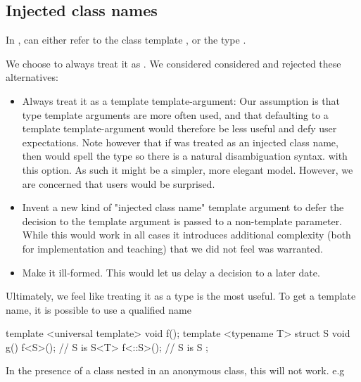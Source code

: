 \documentclass{wg21}
\begin{document}
\subsection{Injected class names}

In ,  can either refer to the class template , or the type .

We choose to always treat it as .
We considered considered and rejected these alternatives:

\begin{itemize}
\item Always treat it as a template template-argument: Our assumption is that type template arguments are more often used, and that defaulting to a template template-argument would therefore be less useful and defy user expectations.
Note however that if  was treated as an injected class name, then  would spell the type so there is a natural disambiguation syntax.
with this option. As such it might be a simpler, more elegant model. However, we are concerned that users would be surprised.

\item Invent a new kind of "injected class name" template argument to defer the decision to the template argument is passed to a non-template parameter.
While this would work in all cases it introduces additional complexity (both for implementation and teaching) that we did not feel was warranted.
\item Make it ill-formed. This would let us delay a decision to a later date.
\end{itemize}

Ultimately, we feel like treating it as a type is the most useful.
To get a template name, it is possible to use a qualified name


\begin{colorblock}
template <universal template>
void f();
template <typename T>
struct S {
    void g() {
        f<S>(); // S is S<T>
        f<::S>(); // S is S
    }
};
\end{colorblock}

In the presence of a class nested in an anonymous class, this will not work.
e.g
\end{document}
